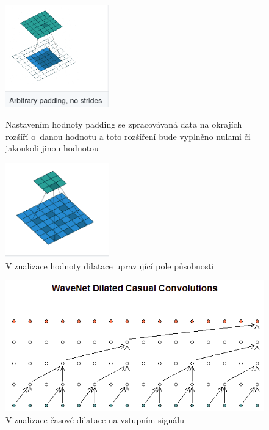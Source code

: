 \begin{figure}[H]
    \centering
    \begin{minipage}{0.45\textwidth}
        \centering
        \includegraphics[width=0.4\textwidth]{obrazky-figures/padding.png}
        \caption{\label{fig:conv_padding}Nastavením hodnoty padding se zpracovávaná data na okrajích rozšíří o~danou hodnotu a toto rozšíření bude vyplněno nulami či jakoukoli jinou hodnotou}
    \end{minipage}\hfill
    \begin{minipage}{0.45\textwidth}
        \centering
        \includegraphics[width=0.4\textwidth]{obrazky-figures/cnndilation.png}
        \caption{\label{fig:conv_dilation}Vizualizace hodnoty dilatace upravující pole působnosti}
    \end{minipage}
\end{figure}


\begin{figure}[H]
    \centering
    \includegraphics[scale=0.7]{obrazky-figures/causal_dilation.png}
    \caption{\label{fig:dilation_factor}Vizualizace časové dilatace na vstupním signálu}
\end{figure}


